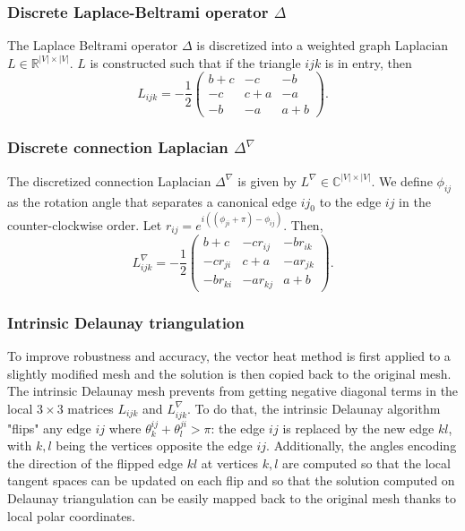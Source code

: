 \documentclass[sigconf]{acmart}
\begin{document}
\subsubsection{Discrete Laplace-Beltrami operator $\Delta$}
The Laplace Beltrami operator $\Delta$ is discretized into a weighted graph Laplacian $L\in \mathbb{R}^{|V|\times |V|}$.
$L$ is constructed such that if the triangle $ijk$ is in entry, then 
$$L_{ijk} = -\frac{1}{2}\begin{pmatrix}
  b + c & -c & -b \\
  -c & c + a & -a \\
  -b & -a & a + b
  \end{pmatrix}.$$

\subsubsection{Discrete connection Laplacian $\Delta^\nabla$} The discretized connection Laplacian 
$\Delta^\nabla$ is given by $L^\nabla \in \mathbb{C}^{|V|\times|V|}$. We define 
$\phi_{ij}$ as the rotation angle that separates a canonical edge $ij_0$ to the edge
$ij$ in the counter-clockwise order. Let $r_{ij} = e^{i((\phi_{ji} + \pi) -  \phi_{ij})}$.
Then, $$
L^\nabla_{ijk} = -\frac{1}{2}\begin{pmatrix}
  b + c & -cr_{ij} & -br_{ik} \\
  -cr_{ji} & c + a & -ar_{jk} \\
  -br_{ki} & -ar_{kj} & a + b
  \end{pmatrix}.
$$
\subsubsection{Intrinsic Delaunay triangulation} To improve robustness and accuracy, the vector heat method is first applied to a 
slightly modified mesh and the solution is then copied back to the original mesh. The intrinsic Delaunay mesh prevents from getting 
negative diagonal terms in the local $3\times3$ matrices $L_{ijk}$ and $L^\nabla_{ijk}$. To do that, the intrinsic Delaunay algorithm 
"flips" any edge $ij$ where $\theta_k^{ij} + \theta_l^{ji}>\pi$: the edge $ij$ is replaced by the new edge $kl$, with $k,l$ being the 
vertices opposite the edge $ij$. Additionally, the angles encoding the direction of the flipped edge $kl$ at vertices $k,l$ are computed 
so that the local tangent spaces can be updated on each flip and so that the solution computed on Delaunay triangulation can be easily mapped 
back to the original mesh thanks to local polar coordinates. 
\end{document}
